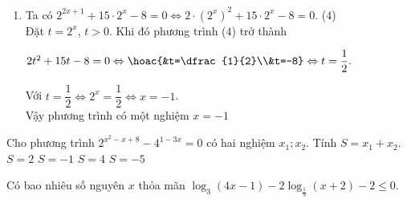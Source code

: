 \begin{ex}
{\begin{enumerate}
			Với $t=\dfrac{1}{4} \Leftrightarrow 2^x=\dfrac{1}{4}\Leftrightarrow  x=-2$.\\
			Vậy phương trình có  hai nghiệm $x=2$, $x=-2$.
			\item  Ta có $2^{2x+1}+15\cdot 2^x-8=0 \Leftrightarrow 2\cdot \left(2^x\right)^2+15\cdot 2^x-8=0$. \qquad ($4$)\\
			Đặt $t=2^x$, $t>0$. Khi đó phương trình  ($4$) trở thành
			\begin{center}
				$2t^2+15t-8=0 \Leftrightarrow \hoac{&t=\dfrac{1}{2}\\&t=-8}\Leftrightarrow t=\dfrac{1}{2}.$ 
			\end{center}
			Với $t=\dfrac{1}{2} \Leftrightarrow 2^x=\dfrac{1}{2}\Leftrightarrow  x=-1$.\\
			Vậy phương trình có một  nghiệm $x=-1$
		\end{enumerate}
	} 
\end{ex}

\begin{ex}%
	Cho phương trình $2^{x^2-x+8} - 4^{1-3x}=0$  có hai nghiệm $x_1; x_2$. Tính $S=x_1+x_2$.
	 \choice
		 {$S=2$}
		{$S=-1$} 
		 {$S=4$}
		{\True $S=-5$} 
\end{ex}

\begin{bt}%
	Có bao nhiêu số nguyên $x$ thỏa  mãn $\log_3(4x-1)-2\log_{\tfrac{1}{9}}(x+2)-2\le0$.
\end{bt}

